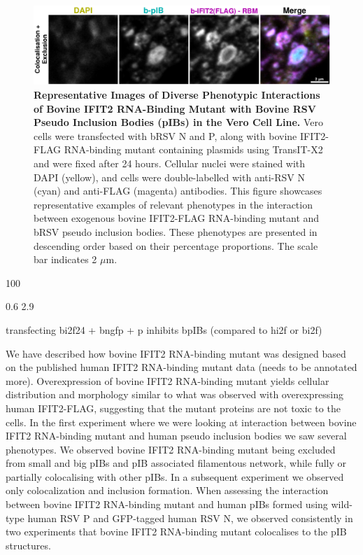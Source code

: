 \begin{figure}
    \centering
    \includegraphics[width=1\linewidth]{09. Chapter 4/Figs/01. pIB/03. IFIT2/05. IFIT2-RNA binding mutant/02. pIB/06. bi2f24-bnbp.pdf}
    \caption[Representative Images of Diverse Phenotypic Interactions of Bovine IFIT2 RNA-Binding Mutant with Bovine RSV Pseudo Inclusion Bodies (pIBs) in the Vero Cell Line.]{\textbf{Representative Images of Diverse Phenotypic Interactions of Bovine IFIT2 RNA-Binding Mutant with Bovine RSV Pseudo Inclusion Bodies (pIBs) in the Vero Cell Line.}  Vero cells were transfected with bRSV N and P, along with bovine IFIT2-FLAG RNA-binding mutant containing plasmids using TransIT-X2 and were fixed after 24 hours. Cellular nuclei were stained with DAPI (yellow), and cells were double-labelled with anti-RSV N (cyan) and anti-FLAG (magenta) antibodies. This figure showcases representative examples of relevant phenotypes in the interaction between exogenous bovine IFIT2-FLAG RNA-binding mutant and bRSV pseudo inclusion bodies. These phenotypes are presented in descending order based on their percentage proportions. The scale bar indicates 2 \(\mu \mbox{m}\).}
    \label{fig:Representative Images of Diverse Phenotypic Interactions of Bovine IFIT2 RNA-Binding Mutant with Bovine RSV Pseudo Inclusion Bodies (pIBs) in the Vero Cell Line}
\end{figure}

100

0.6 2.9


transfecting bi2f24 + bngfp + p inhibits bpIBs (compared to hi2f or bi2f)

We have described how bovine IFIT2 RNA-binding mutant was designed based on the published human IFIT2 RNA-binding mutant data (needs to be annotated more). Overexpression of bovine IFIT2 RNA-binding mutant yields cellular distribution and morphology similar to what was observed with overexpressing human IFIT2-FLAG, suggesting that the mutant proteins are not toxic to the cells. In the first experiment where we were looking at interaction between bovine IFIT2 RNA-binding mutant and human pseudo inclusion bodies we saw several phenotypes. We observed bovine IFIT2 RNA-binding mutant being excluded from small and big pIBs and pIB associated filamentous network, while fully or partially colocalising with other pIBs. In a subsequent experiment we observed only colocalization and inclusion formation. When assessing the interaction between bovine IFIT2 RNA-binding mutant and human pIBs formed using wild-type human RSV P and GFP-tagged human RSV N, we observed consistently in two experiments that bovine IFIT2 RNA-binding mutant colocalises to the pIB structures.